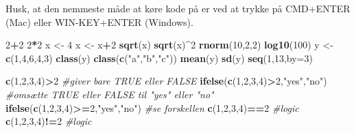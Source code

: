 \documentclass[
]{book}
\newenvironment{Shaded}{\begin{snugshade}}{\end{snugshade}}
\newcommand{\AttributeTok}[1]{\textcolor[rgb]{0.13,0.29,0.53}{#1}}
\newcommand{\CommentTok}[1]{\textcolor[rgb]{0.56,0.35,0.01}{\textit{#1}}}
\newcommand{\DecValTok}[1]{\textcolor[rgb]{0.00,0.00,0.81}{#1}}
\newcommand{\FunctionTok}[1]{\textcolor[rgb]{0.13,0.29,0.53}{\textbf{#1}}}
\newcommand{\NormalTok}[1]{#1}
\newcommand{\OtherTok}[1]{\textcolor[rgb]{0.56,0.35,0.01}{#1}}
\newcommand{\SpecialCharTok}[1]{\textcolor[rgb]{0.81,0.36,0.00}{\textbf{#1}}}
\newcommand{\StringTok}[1]{\textcolor[rgb]{0.31,0.60,0.02}{#1}}
\begin{document}
Husk, at den nemmeste måde at køre kode på er ved at trykke på CMD+ENTER (Mac) eller WIN-KEY+ENTER (Windows).

\begin{Shaded}
\begin{Highlighting}[]
\DecValTok{2}\SpecialCharTok{+}\DecValTok{2}
\DecValTok{2}\SpecialCharTok{*}\DecValTok{2}
\NormalTok{x }\OtherTok{\textless{}{-}} \DecValTok{4}
\NormalTok{x }\OtherTok{\textless{}{-}}\NormalTok{ x}\SpecialCharTok{+}\DecValTok{2}
\FunctionTok{sqrt}\NormalTok{(x)}
\FunctionTok{sqrt}\NormalTok{(x)}\SpecialCharTok{\^{}}\DecValTok{2}
\FunctionTok{rnorm}\NormalTok{(}\DecValTok{10}\NormalTok{,}\DecValTok{2}\NormalTok{,}\DecValTok{2}\NormalTok{)}
\FunctionTok{log10}\NormalTok{(}\DecValTok{100}\NormalTok{)}
\NormalTok{y }\OtherTok{\textless{}{-}}  \FunctionTok{c}\NormalTok{(}\DecValTok{1}\NormalTok{,}\DecValTok{4}\NormalTok{,}\DecValTok{6}\NormalTok{,}\DecValTok{4}\NormalTok{,}\DecValTok{3}\NormalTok{)}
\FunctionTok{class}\NormalTok{(y)}
\FunctionTok{class}\NormalTok{(}\FunctionTok{c}\NormalTok{(}\StringTok{"a"}\NormalTok{,}\StringTok{"b"}\NormalTok{,}\StringTok{"c"}\NormalTok{))}
\FunctionTok{mean}\NormalTok{(y)}
\FunctionTok{sd}\NormalTok{(y)}
\FunctionTok{seq}\NormalTok{(}\DecValTok{1}\NormalTok{,}\DecValTok{13}\NormalTok{,}\AttributeTok{by=}\DecValTok{3}\NormalTok{)}
\end{Highlighting}
\end{Shaded}

\begin{Shaded}
\begin{Highlighting}[]
\FunctionTok{c}\NormalTok{(}\DecValTok{1}\NormalTok{,}\DecValTok{2}\NormalTok{,}\DecValTok{3}\NormalTok{,}\DecValTok{4}\NormalTok{)}\SpecialCharTok{\textgreater{}}\DecValTok{2} \CommentTok{\#giver bare TRUE eller FALSE}
\FunctionTok{ifelse}\NormalTok{(}\FunctionTok{c}\NormalTok{(}\DecValTok{1}\NormalTok{,}\DecValTok{2}\NormalTok{,}\DecValTok{3}\NormalTok{,}\DecValTok{4}\NormalTok{)}\SpecialCharTok{\textgreater{}}\DecValTok{2}\NormalTok{,}\StringTok{"yes"}\NormalTok{,}\StringTok{"no"}\NormalTok{) }\CommentTok{\#omsætte TRUE eller FALSE til "yes" eller "no"}
\FunctionTok{ifelse}\NormalTok{(}\FunctionTok{c}\NormalTok{(}\DecValTok{1}\NormalTok{,}\DecValTok{2}\NormalTok{,}\DecValTok{3}\NormalTok{,}\DecValTok{4}\NormalTok{)}\SpecialCharTok{\textgreater{}=}\DecValTok{2}\NormalTok{,}\StringTok{"yes"}\NormalTok{,}\StringTok{"no"}\NormalTok{) }\CommentTok{\#se forskellen}
\FunctionTok{c}\NormalTok{(}\DecValTok{1}\NormalTok{,}\DecValTok{2}\NormalTok{,}\DecValTok{3}\NormalTok{,}\DecValTok{4}\NormalTok{)}\SpecialCharTok{==}\DecValTok{2} \CommentTok{\#logic}
\FunctionTok{c}\NormalTok{(}\DecValTok{1}\NormalTok{,}\DecValTok{2}\NormalTok{,}\DecValTok{3}\NormalTok{,}\DecValTok{4}\NormalTok{)}\SpecialCharTok{!=}\DecValTok{2} \CommentTok{\#logic}
\end{Highlighting}
\end{Shaded}
\end{document}
